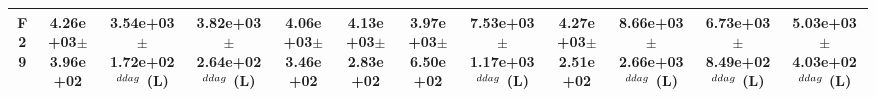 \begin{table}[!t]
\begin{tabular}{c|ccccccccccc}
F29  & 4.26e+03$\pm$3.96e+02  & 3.54e+03$\pm$1.72e+02$^{\\ddag}$ (L)  & 3.82e+03$\pm$2.64e+02$^{\\ddag}$ (L)  & 4.06e+03$\pm$3.46e+02   & 4.13e+03$\pm$2.83e+02   & 3.97e+03$\pm$6.50e+02   & \textbf{7.53e+03$\pm$1.17e+03}$^{\\ddag}$ (L)  & 4.27e+03$\pm$2.51e+02   & \textbf{8.66e+03$\pm$2.66e+03}$^{\\ddag}$ (L)  & \textbf{6.73e+03$\pm$8.49e+02}$^{\\ddag}$ (L)  & \textbf{5.03e+03$\pm$4.03e+02}$^{\\ddag}$ (L) \\ \hline
\end{tabular}
\end{table}
